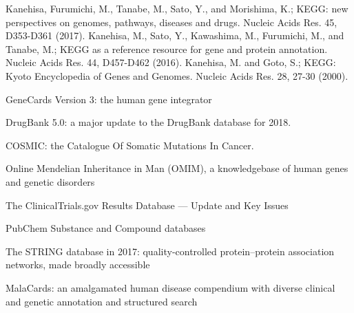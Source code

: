 
\begin{thebibliography}{00}


 Kanehisa, Furumichi, M., Tanabe, M., Sato, Y., and Morishima, K.; 
\newblock KEGG: new perspectives on genomes, pathways, diseases and drugs. 
\newblock Nucleic Acids Res. 45, D353-D361 (2017).
 Kanehisa, M., Sato, Y., Kawashima, M., Furumichi, M., and Tanabe, M.; 
\newblock KEGG as a reference resource for gene and protein annotation. 
\newblock Nucleic Acids Res. 44, D457-D462 (2016).
 Kanehisa, M. and Goto, S.; 
\newblock KEGG: Kyoto Encyclopedia of Genes and Genomes. 
\newblock Nucleic Acids Res. 28, 27-30 (2000).


GeneCards Version 3: the human gene integrator

 DrugBank 5.0: a major update to the DrugBank database for 2018.

 COSMIC: the Catalogue Of Somatic Mutations In Cancer.

 Online Mendelian Inheritance in Man (OMIM), a knowledgebase of human genes and genetic disorders

 The ClinicalTrials.gov Results Database — Update and Key Issues

 PubChem Substance and Compound databases

 The STRING database in 2017: quality-controlled protein–protein association networks, made broadly accessible

 MalaCards: an amalgamated human disease compendium with diverse clinical and genetic annotation and structured search

\end{thebibliography}

